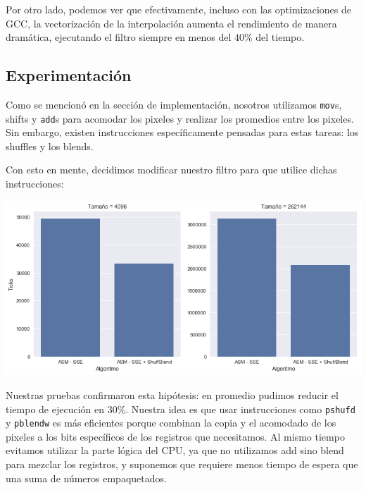 Por otro lado, podemos ver que efectivamente, incluso con las optimizaciones de GCC, la vectorización de la interpolación aumenta el rendimiento de manera dramática, ejecutando el filtro siempre en menos del 40\% del tiempo.

\subsection{Experimentación}

Como se mencionó en la sección de implementación, nosotros utilizamos \texttt{mov}s, shifts y \texttt{add}s para acomodar los pixeles y realizar los promedios entre los pixeles. Sin embargo, existen instrucciones específicamente pensadas para estas tareas: los shuffles y los blends.

Con esto en mente, decidimos modificar nuestro filtro para que utilice dichas instrucciones:

\begin{center}
  \includegraphics[scale=0.5]{img/linearZoom_shuf_bars.png}
\end{center}

Nuestras pruebas confirmaron esta hipótesis: en promedio pudimos reducir el tiempo de ejecución en 30\%. Nuestra idea es que usar instrucciones como \texttt{pshufd} y \texttt{pblendw} es más eficientes porque combinan la copia y el acomodado de los pixeles a los bits específicos de los registros que necesitamos. Al mismo tiempo evitamos utilizar la parte lógica del CPU, ya que no utilizamos add sino blend para mezclar los registros, y suponemos que requiere menos tiempo de espera que una suma de números empaquetados.